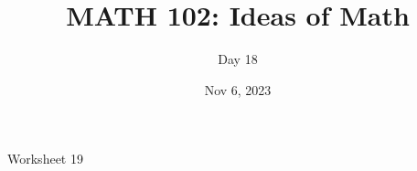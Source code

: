 \documentclass[aspectratio=169]{beamer}
\title{MATH 102: Ideas of Math}
\author{Day 18}
\date{Nov 6, 2023}
\begin{document}
\frame{\titlepage}

\begin{frame}
Worksheet 19
\end{frame}
\end{document}
